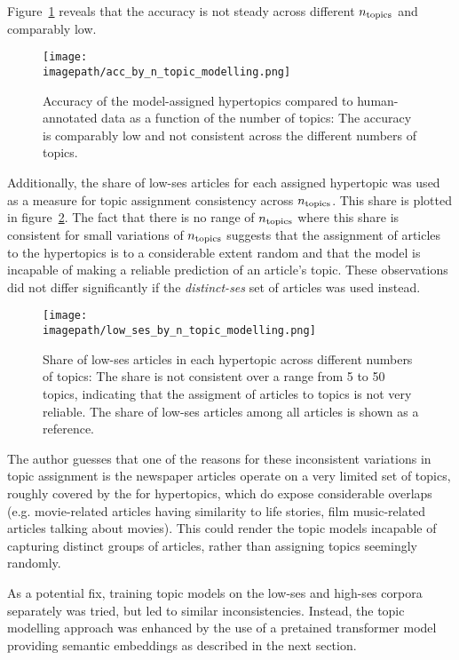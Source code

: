 Figure~\ref{fig:accuracy_by_ntopics} reveals that the accuracy is not steady across different $n_\text{topics}$ and comparably low.

\begin{figure}
    \centering
    \texttt{[image: \\imagepath/acc\_by\_n\_topic\_modelling.png]}
    \caption{Accuracy of the model-assigned hypertopics compared to human-annotated data as a function of the number of topics: The accuracy is comparably low and not consistent across the different numbers of topics.}\label{fig:accuracy_by_ntopics}
\end{figure}

Additionally, the share of low-\gls{ses} articles for each assigned hypertopic was used as a measure for topic assignment consistency across $n_\text{topics}$. This share is plotted in figure~\ref{fig:lowshare_per_ntopics}. The fact that there is no range of $n_\text{topics}$ where this share is consistent for small variations of $n_\text{topics}$ suggests that the assignment of articles to the hypertopics is to a considerable extent random and that the model is incapable of making a reliable prediction of an article's topic. These observations did not differ significantly if the \textit{distinct-\gls{ses}} set of articles was used instead.

\begin{figure}
    \centering
    \texttt{[image: \\imagepath/low\_ses\_by\_n\_topic\_modelling.png]}
    \caption{Share of low-\gls{ses} articles in each hypertopic across different numbers of topics: The share is not consistent over a range from \SI{5}{} to \SI{50}{} topics, indicating that the assigment of articles to topics is not very reliable. The share of low-\gls{ses} articles among all articles is shown as a reference.}\label{fig:lowshare_per_ntopics}
\end{figure}

The author guesses that one of the reasons for these inconsistent variations in topic assignment is the newspaper articles operate on a very limited set of topics, roughly covered by the for hypertopics, which do expose considerable overlaps (e.g. movie-related articles having similarity to life stories, film music-related articles talking about movies). This could render the topic models incapable of capturing distinct groups of articles, rather than assigning topics seemingly randomly.

As a potential fix, training topic models on the low-\gls{ses} and high-\gls{ses} corpora separately was tried, but led to similar inconsistencies. Instead, the topic modelling approach was enhanced by the use of a pretained transformer model providing semantic embeddings as described in the next section.

